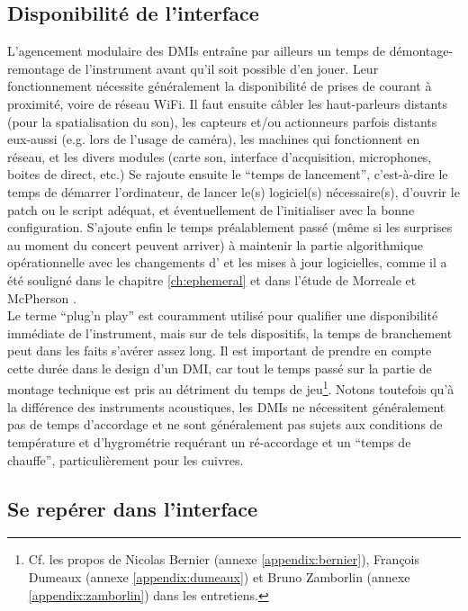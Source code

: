 \subsection{Disponibilité de l'interface}
\label{sec:interfaces:ergonomy:disponibility}

\noindent L'agencement modulaire des \glspl{DMI} entraîne par ailleurs un temps de démontage-remontage de l'instrument avant qu'il soit possible d'en jouer. Leur fonctionnement nécessite généralement la disponibilité de prises de courant à proximité, voire de réseau WiFi. Il faut ensuite câbler les haut-parleurs distants (pour la spatialisation du son), les capteurs et/ou actionneurs parfois distants eux-aussi (e.g. lors de l'usage de caméra), les machines qui fonctionnent en réseau, et les divers modules (carte son, interface d'acquisition, microphones, boites de direct, etc.) Se rajoute ensuite le ``temps de lancement'', c'est-à-dire le temps de démarrer l'ordinateur, de lancer le(s) logiciel(s) nécessaire(s), d'ouvrir le patch ou le script adéquat, et éventuellement de l'initialiser avec la bonne configuration. S'ajoute enfin le temps préalablement passé (même si les surprises au moment du concert peuvent arriver) à maintenir la partie algorithmique opérationnelle avec les changements d' et les mises à jour logicielles, comme il a été souligné dans le chapitre \ref{ch:ephemeral} et dans l'étude de Morreale et McPherson \cite{morreale_design_2017}.\\
\indent Le terme ``plug'n play'' est couramment utilisé pour qualifier une disponibilité immédiate de l'instrument, mais sur de tels dispositifs, la temps de branchement peut dans les faits s'avérer assez long. Il est important de prendre en compte cette durée dans le design d'un \gls{DMI}, car tout le temps passé sur la partie de montage technique est pris au détriment du temps de jeu\footnote{Cf. les propos de Nicolas Bernier (annexe \ref{appendix:bernier}), François Dumeaux (annexe \ref{appendix:dumeaux}) et Bruno Zamborlin (annexe \ref{appendix:zamborlin}) dans les entretiens.}. Notons toutefois qu'à la différence des instruments acoustiques, les \glspl{DMI} ne nécessitent généralement pas de temps d'accordage et ne sont généralement pas sujets aux conditions de température et d'hygrométrie requérant un ré-accordage et un ``temps de chauffe'', particulièrement pour les cuivres.


\subsection{Se repérer dans l'interface}
\label{sec:interfaces:ergonomy:cues}

